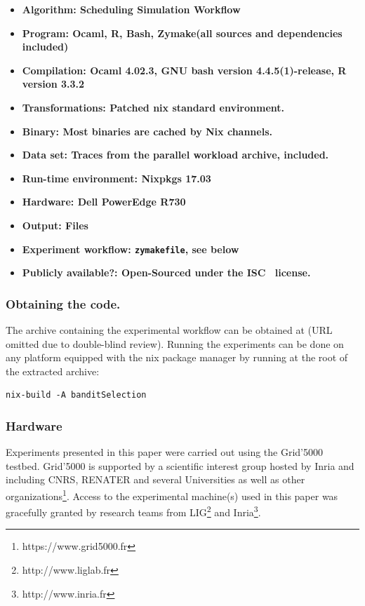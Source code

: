 \documentclass[sigconf,anonymous]{acmart}
\begin{document}
{\small
\begin{itemize}
  \item {\bf Algorithm: Scheduling Simulation Workflow}
  \item {\bf Program: Ocaml, R, Bash, Zymake(all sources and dependencies included)}
  \item {\bf Compilation: Ocaml 4.02.3, GNU bash version 4.4.5(1)-release, R version 3.3.2}
  \item {\bf Transformations: Patched nix standard environment.}
  \item {\bf Binary: Most binaries are cached by Nix channels.}
  \item {\bf Data set: Traces from the parallel workload archive, included.}
  \item {\bf Run-time environment: Nixpkgs 17.03}
  \item {\bf Hardware: Dell PowerEdge R730}
  \item {\bf Output: Files}
  \item {\bf Experiment workflow: \lstinline[basicstyle=\ttfamily\color{blue}]|zymakefile|, see below}
  \item {\bf Publicly available?: Open-Sourced under the ISC~\cite{isc} license.}
\end{itemize}
}

\subsubsection{Obtaining the code.}

The archive containing the experimental workflow can be obtained at
(URL omitted due to double-blind review). Running the experiments can be done
on any platform equipped with the nix package manager by running at the root of
the extracted archive:

\begin{lstlisting}
nix-build -A banditSelection
\end{lstlisting}

\subsubsection{Hardware}

 Experiments presented in this paper were carried out using the Grid'5000
 testbed. Grid'5000 is supported by a scientific interest group hosted by Inria
 and including CNRS, RENATER and several Universities as well as other
 organizations\footnote{https://www.grid5000.fr}.  Access to the experimental
 machine(s) used in this paper was gracefully granted by research teams from
 LIG\footnote{http://www.liglab.fr} and Inria\footnote{http://www.inria.fr}.
\end{document}
